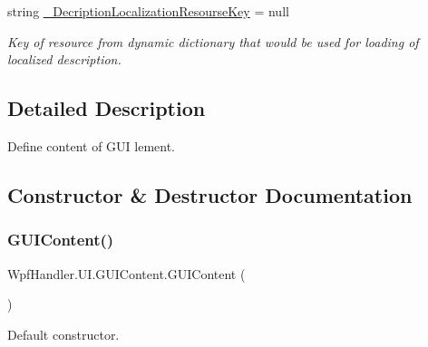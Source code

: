 \begin{DoxyCompactItemize}
string \mbox{\hyperlink{class_wpf_handler_1_1_u_i_1_1_g_u_i_content_a067181a637a28c683c1a24ed06e577ae}{\+\_\+\+Decription\+Localization\+Resourse\+Key}} = null
\begin{DoxyCompactList}\small\item\em Key of resource from dynamic dictionary that would be used for loading of localized description. \end{DoxyCompactList}\end{DoxyCompactItemize}


\subsection{Detailed Description}
Define content of G\+UI lement. 



\subsection{Constructor \& Destructor Documentation}
\mbox{\label{class_wpf_handler_1_1_u_i_1_1_g_u_i_content_a94df176704a9da39956a31d4cc1f3aeb}} 
\subsubsection{\texorpdfstring{G\+U\+I\+Content()}{GUIContent()}\hspace{0.1cm}{\footnotesize\ttfamily [1/5]}}
{\footnotesize\ttfamily Wpf\+Handler.\+U\+I.\+G\+U\+I\+Content.\+G\+U\+I\+Content (\begin{DoxyParamCaption}{ }\end{DoxyParamCaption})}



Default constructor. 

\mbox{\label{class_wpf_handler_1_1_u_i_1_1_g_u_i_content_a4608943cf14878430faed858fb93b6fa}} 

